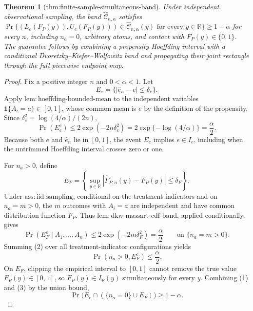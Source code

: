 \documentclass{article}
\newtheorem{theorem}{Theorem}
\begin{document}
\begin{theorem}[thm:finite-sample-simultaneous-band]\label{thm:finite-sample-simultaneous-band}
Under independent observational sampling, the band \(\widehat{\mathcal C}_{n,\alpha}\) satisfies \(\Pr\{(L_e(F_P(y)),U_e(F_P(y)))\in\widehat{\mathcal C}_{n,\alpha}(y)\text{ for every }y\in\mathbb R\}\ge1-\alpha\) for every \(n\), including \(n_a=0\), arbitrary atoms, and contact with \(F_P(y)\in\{0,1\}\). The guarantee follows by combining a propensity Hoeffding interval with a conditional Dvoretzky--Kiefer--Wolfowitz band and propagating their joint rectangle through the full piecewise endpoint map.
\end{theorem}
\begin{proof}
Fix a positive integer \(n\) and \(0<\alpha<1\).  Let
\[
 E_e=\{|\widehat e_n-e|\le\delta_e\}.
\]
Apply \(\mathrm{lem:hoeffding\text{-}bounded\text{-}mean}\) to the independent variables \(\mathbf 1\{A_i=a\}\in[0,1]\), whose common mean is \(e\) by the definition of the propensity.  Since \(\delta_e^2=\log(4/\alpha)/(2n)\),
\[
 \Pr(E_e^c)
 \le 2\exp(-2n\delta_e^2)
 =2\exp\{-\log(4/\alpha)\}
 =\frac{\alpha}{2}. \tag{1}
\]
Because both \(e\) and \(\widehat e_n\) lie in \([0,1]\), the event \(E_e\) implies \(e\in I_e\), including when the untrimmed Hoeffding interval crosses zero or one.

For \(n_a>0\), define
\[
 E_F=\left\{\sup_{y\in\mathbb R}|\widehat F_{P,n}(y)-F_P(y)|\le\delta_F\right\}.
\]
Under \(\mathrm{ass:iid\text{-}sampling}\), conditional on the treatment indicators and on \(n_a=m>0\), the \(m\) outcomes with \(A_i=a\) are independent and have common distribution function \(F_P\).  Thus \(\mathrm{lem:dkw\text{-}massart\text{-}cdf\text{-}band}\), applied conditionally, gives
\[
 \Pr(E_F^c\mid A_1,\ldots,A_n)
 \le 2\exp(-2m\delta_F^2)
 =\frac{\alpha}{2}
 \qquad\text{on }\{n_a=m>0\}. \tag{2}
\]
Summing (2) over all treatment-indicator configurations yields
\[
 \Pr(n_a>0,E_F^c)\le\frac{\alpha}{2}. \tag{3}
\]
On \(E_F\), clipping the empirical interval to \([0,1]\) cannot remove the true value \(F_P(y)\in[0,1]\), so \(F_P(y)\in I_F(y)\) simultaneously for every \(y\).
Combining (1) and (3) by the union bound,
\[
 \Pr\bigl(E_e\cap(\{n_a=0\}\cup E_F)\bigr)\ge1-\alpha. \tag{4}
\]


\end{proof}
\end{document}
